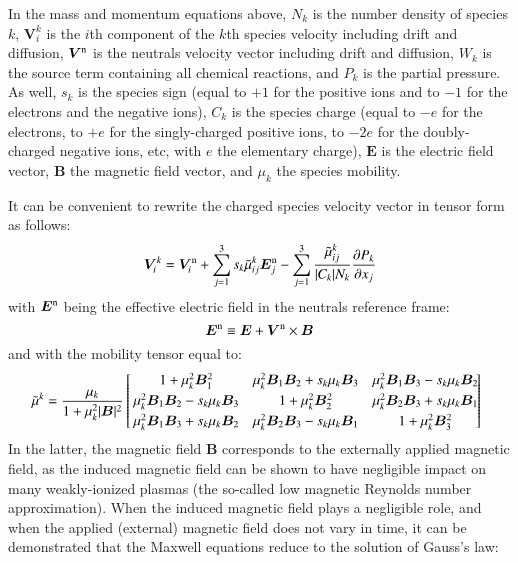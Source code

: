 \documentclass{warpdoc}
\newcommand{\alb}{\vspace{0.1cm}\\} %
\newcommand{\mfd}{\displaystyle}
\newcommand{\nd}{3}
\renewcommand{\vec}[1]{\bm{#1}}
\begin{document}
In the mass and momentum equations above, $N_k$ is the number density of species $k$, $\vec{V}_i^k$ is the $i$th component of the $k$th species velocity including drift and diffusion, $\vec{V}^{\rm n}$ is the neutrals velocity vector including drift and diffusion, $W_k$ is the source term containing all chemical reactions, and $P_k$ is the partial pressure. As well, $s_k$ is the species sign  (equal to $+1$ for the positive ions and to $-1$ for the electrons and the negative ions), $C_k$ is the species charge  (equal to $-e$ for the electrons, to $+e$ for the singly-charged positive ions, to $-2e$ for the doubly-charged negative ions, etc, with $e$ the elementary charge), $\vec{E}$ is the electric field vector, $\vec{B}$ the magnetic field vector, and $\mu_k$ the species mobility.
 
It can be convenient to rewrite the  charged species velocity vector in tensor form as follows:
%
\begin{equation}
  \vec{V}^{k}_i = \vec{V}^{\rm n}_i+\sum_{j=1}^\nd s_k \wtilde{\mu}^k_{ij}  \vec{E}_j^{\rm n}
             - \sum_{j=1}^\nd  \frac{\wtilde{\mu}^{k}_{ij}}{|C_k| N_k} \frac{\partial P_k}{\partial x_j}
  \label{eqn:V}
\end{equation}
%
with $\vec{E}^{\rm n}$ being the effective electric field in the neutrals reference frame:
%
\begin{equation}
\vec{E}^{\rm n} \equiv \vec{E}+\vec{V}^{\rm n} \times \vec{B}
\label{eqn:En}
\end{equation}
%
and with the mobility tensor equal to:
%
\begin{equation}
\!\!\!
\begin{array}{l}\mfd
\wtilde{\mu}^k  =\frac{\mu_k}{1+\mu_k^2|\vec{B}|^2}\left[\!\!\begin{array}{ccc} 
      1+\mu_k^2 \vec{B}_1^2 
     & \mu_k^2\vec{B}_1\vec{B}_2+s_k \mu_k \vec{B}_3  
     & \mu_k^2\vec{B}_1\vec{B}_3-s_k \mu_k \vec{B}_2 \alb
      \mu_k^2\vec{B}_1\vec{B}_2-s_k\mu_k\vec{B}_3 & 1+\mu_k^2\vec{B}_2^2 &  \mu_k^2\vec{B}_2\vec{B}_3+s_k\mu_k\vec{B}_1  \alb
      \mu_k^2\vec{B}_1\vec{B}_3 +s_k\mu_k\vec{B}_2 & \mu_k^2 \vec{B}_2\vec{B}_3-s_k\mu_k\vec{B}_1  & 1+\mu_k^2\vec{B}_3^2 
    \end{array} \!\!\!\!\right]
\end{array}
\label{eqn:mutilde}
\end{equation}
%
In the latter, the magnetic field $\vec{B}$ corresponds to the externally applied magnetic field, as the induced magnetic field can be shown to have negligible impact on many weakly-ionized plasmas (the so-called low magnetic Reynolds number approximation). When the induced magnetic field plays a negligible role, and when the applied (external) magnetic field does not vary in time, it can be demonstrated that the Maxwell equations reduce to the solution of Gauss's law:
\end{document}
